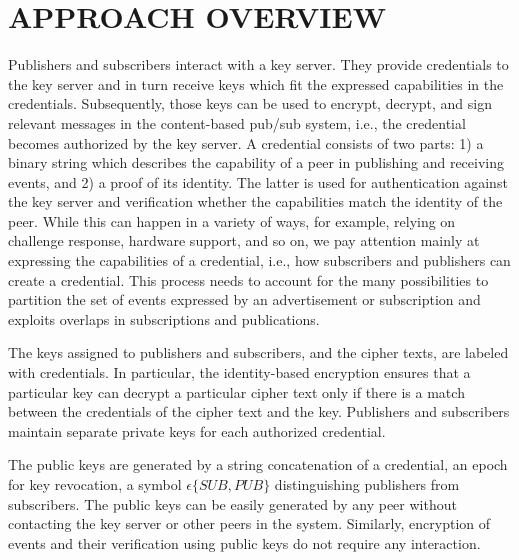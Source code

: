 \documentclass[MTech]{iitmdiss}
\begin{document}
\chapter{APPROACH OVERVIEW}
\label{chap:propos}
Publishers and subscribers interact with
a key server. They provide credentials to the key server and
in turn receive keys which fit the expressed capabilities in
the credentials. Subsequently, those keys can be used to
encrypt, decrypt, and sign relevant messages in the content-based pub/sub system, i.e., the credential becomes authorized by the key server. A credential consists of two parts:
1) a binary string which describes the capability of a peer in
publishing and receiving events, and 2) a proof of its
identity. The latter is used for authentication against the key
server and verification whether the capabilities match the
identity of the peer. While this can happen in a variety of
ways, for example, relying on challenge response, hardware
support, and so on, we pay attention mainly at expressing
the capabilities of a credential, i.e., how subscribers and
publishers can create a credential. This process needs to
account for the many possibilities to partition the set of
events expressed by an advertisement or subscription and
exploits overlaps in subscriptions and publications. 

The keys assigned to publishers and subscribers, and the
cipher texts, are labeled with credentials. In particular, the
identity-based encryption ensures that a particular key can
decrypt a particular cipher text only if there is a match
between the credentials of the cipher text and the key.
Publishers and subscribers maintain separate private keys
for each authorized credential.

The public keys are generated by a string concatenation
of a credential, an epoch for key revocation, a symbol $\epsilon\{ SUB, PUB\}$ distinguishing publishers from subscribers. The public keys can be easily generated by any peer
without contacting the key server or other peers in the
system. Similarly, encryption of events and their verification using public keys do not require any interaction.
\end{document}
